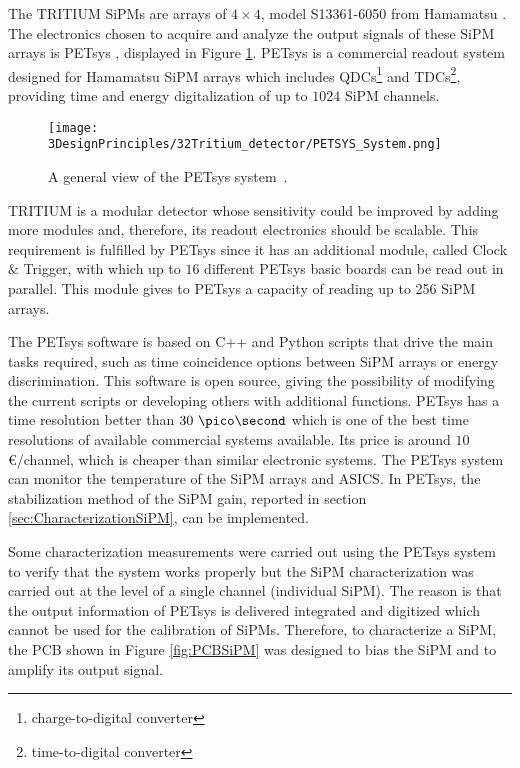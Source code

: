 The TRITIUM SiPMs are arrays of $4\times 4$, model S13361-6050 from Hamamatsu \cite{DataSheetHammamatsu_16_SiPM_50}. The electronics chosen to acquire and analyze the output signals of these SiPM arrays is PETsys \cite{PETSYS}, displayed in Figure \ref{fig:PETSYS}. PETsys is a commercial readout system designed for Hamamatsu SiPM arrays which includes QDCs\footnote{charge-to-digital converter} and TDCs\footnote{time-to-digital converter}, providing time and energy digitalization of up to $1024$ SiPM channels. 

\begin{figure}[h]
\centering
\texttt{[image: 3DesignPrinciples/32Tritium\_detector/PETSYS\_System.png]}
\caption{A general view of the PETsys system\label{fig:PETSYS}~\cite{PETSYS}.}
\end{figure}
TRITIUM is a modular detector whose sensitivity could be improved by adding more modules and, therefore, its readout electronics should be scalable. This requirement is fulfilled by PETsys since it has an additional module, called Clock $\&$ Trigger, with which up to $16$ different PETsys basic boards can be read out in parallel. This module gives to PETsys a capacity of reading up to 256 SiPM arrays. 

The PETsys software is based on C++ and Python scripts that drive the main tasks required, such as time coincidence options between SiPM arrays or energy discrimination. This software is open source, giving the possibility of modifying the current scripts or developing others with additional functions. PETsys has a time resolution better than $30~\pico\second$ which is one of the best time resolutions of available commercial systems available. Its price is around $10$ \euro /channel, which is cheaper than similar electronic systems. The PETsys system can monitor the temperature of the SiPM arrays and ASICS. In PETsys, the stabilization method of the SiPM gain, reported in section \ref{sec:CharacterizationSiPM}, can be implemented.

Some characterization measurements were carried out using the PETsys system to verify that the system works properly but the SiPM characterization was carried out at the level of a single channel (individual SiPM). The reason is that the output information of PETsys is delivered integrated and digitized which cannot be used for the calibration of SiPMs. Therefore, to characterize a SiPM, the PCB shown in Figure \ref{fig:PCBSiPM} was designed to bias the SiPM and to amplify its output signal. 

